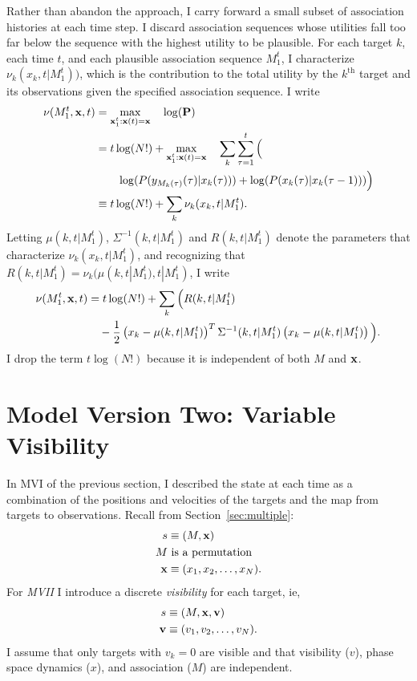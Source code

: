 \documentclass[11pt]{article}
\newcommand{\ti}[2]{{#1}{(#2)}}                         %
\newcommand{\ts}[4]{{#1}_{#3}^{#4}} %
\begin{document}
Rather than abandon the approach, I carry forward a small subset of
association histories at each time step.  I discard association
sequences whose utilities fall too far below the sequence with the
highest utility to be plausible.  For each target $k$, each time $t$,
and each plausible association sequence $\ts{M}{}{1}{t}$, I characterize
$\nu_k(x_k,t|\ts{M}{}{1}{t}))$, which is the contribution to the total
utility by the $k^{\text{th}}$ target and its observations given the specified
association sequence.  I write
\begin{align*}
  \nu(\ts{M}{}{1}{t},\bx,t) &= \mxx \quad \log(\mathbf{P})\\
  &= t\log(N!) +  \mxx \quad \sum_k \sum_{\tau=1}^t \Big(\\
  & \quad \quad \log(P(\ti{y_{M_k(\tau)}}{\tau}|\ti{x_k}{\tau})) +
  \log( P(\ti{x_k}{\tau}|\ti{x_k}{\tau-1}) ) \Big) \\
  & \equiv t\log(N!) + \sum_k \nu_k(x_k,t|\ts{M}{}{1}{t}).
\end{align*}
Letting $\mu(k,t|\ts{M}{}{1}{t})$, $\Sigma^{-1}(k,t|\ts{M}{}{1}{t})$ and
$R(k,t|\ts{M}{}{1}{t})$ denote the parameters that characterize
$\nu_k(x_k,t|\ts{M}{}{1}{t})$, and recognizing that $R(k,t|\ts{M}{}{1}{t})
= \nu_k(\mu(k,t|\ts{M}{}{1}{t}),t|\ts{M}{}{1}{t})$, I write
\begin{align*}
  \nu(\ts{M}{}{1}{t},\bx,t) &= t\log(N!) + \sum_k \Big( R(k,t|\ts{M}{}{1}{t}) \\
  &\quad - \frac{1}{2} \left( x_k-\mu(k,t|\ts{M}{}{1}{t}) \right)^T
  \Sigma^{-1}(k,t|\ts{M}{}{1}{t}) \left( x_k-\mu(k,t|\ts{M}{}{1}{t})
  \right) \Big).
\end{align*}
I drop the term $t\log(N!)$ because it is independent of both $M$ and
${\mathbf{x}}$.

\section{Model Version Two: Variable Visibility}
\label{sec:model2}

In MVI of the previous section, I described the state at each time as
a combination of the positions and velocities of the targets and the
map from targets to observations.  Recall from
Section~\ref{sec:multiple}:
\begin{align*}
  s &\equiv (M,{\mathbf{x}}) \\
  M & \text{ is a permutation} \\
  {\mathbf{x}} &\equiv (x_1,x_2,\ldots,x_N).
\end{align*}
For \emph{MVII} I introduce a discrete \emph{visibility} for each
target, ie, \newcommand{\bv}{{\mathbf{v}}}
\begin{align*}
  s &\equiv (M,\bx,\bv) \\
  \bv &\equiv (v_1,v_2,\ldots,v_N).
\end{align*}
I assume that only targets with $v_k=0$ are visible and that
visibility ($v$), phase space dynamics ($x$), and association ($M$) are
independent.
\end{document}
